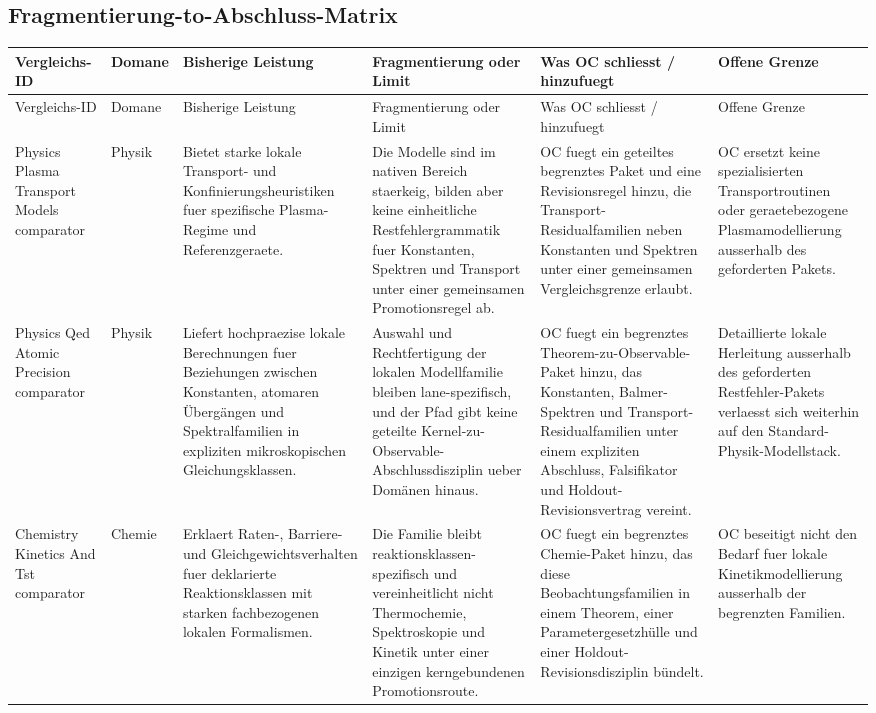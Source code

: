 \subsection{Fragmentierung-to-Abschluss-Matrix}
\begin{longtable}{@{}L{0.17\textwidth}L{0.09\textwidth}L{0.17\textwidth}L{0.17\textwidth}L{0.20\textwidth}L{0.14\textwidth}@{}}
\toprule
Vergleichs-ID & Domane & Bisherige Leistung & Fragmentierung oder Limit & Was OC schliesst / hinzufuegt & Offene Grenze \\
\midrule
\endfirsthead
\toprule
Vergleichs-ID & Domane & Bisherige Leistung & Fragmentierung oder Limit & Was OC schliesst / hinzufuegt & Offene Grenze \\
\midrule
\endhead
Physics Plasma Transport Models comparator & Physik & Bietet starke lokale Transport- und Konfinierungsheuristiken fuer spezifische Plasma-Regime und Referenzgeraete. & Die Modelle sind im nativen Bereich staerkeig, bilden aber keine einheitliche Restfehlergrammatik fuer Konstanten, Spektren und Transport unter einer gemeinsamen Promotionsregel ab. & OC fuegt ein geteiltes begrenztes Paket und eine Revisionsregel hinzu, die Transport-Residualfamilien neben Konstanten und Spektren unter einer gemeinsamen Vergleichsgrenze erlaubt. & OC ersetzt keine spezialisierten Transportroutinen oder geraetebezogene Plasmamodellierung ausserhalb des geforderten Pakets. \\
Physics Qed Atomic Precision comparator & Physik & Liefert hochpraezise lokale Berechnungen fuer Beziehungen zwischen Konstanten, atomaren Übergängen und Spektralfamilien in expliziten mikroskopischen Gleichungsklassen. & Auswahl und Rechtfertigung der lokalen Modellfamilie bleiben lane-spezifisch, und der Pfad gibt keine geteilte Kernel-zu-Observable-Abschlussdisziplin ueber Domänen hinaus. & OC fuegt ein begrenztes Theorem-zu-Observable-Paket hinzu, das Konstanten, Balmer-Spektren und Transport-Residualfamilien unter einem expliziten Abschluss, Falsifikator und Holdout-Revisionsvertrag vereint. & Detaillierte lokale Herleitung ausserhalb des geforderten Restfehler-Pakets verlaesst sich weiterhin auf den Standard-Physik-Modellstack. \\
Chemistry Kinetics And Tst comparator & Chemie & Erklaert Raten-, Barriere- und Gleichgewichtsverhalten fuer deklarierte Reaktionsklassen mit starken fachbezogenen lokalen Formalismen. & Die Familie bleibt reaktionsklassen-spezifisch und vereinheitlicht nicht Thermochemie, Spektroskopie und Kinetik unter einer einzigen kerngebundenen Promotionsroute. & OC fuegt ein begrenztes Chemie-Paket hinzu, das diese Beobachtungsfamilien in einem Theorem, einer Parametergesetzhülle und einer Holdout-Revisionsdisziplin bündelt. & OC beseitigt nicht den Bedarf fuer lokale Kinetikmodellierung ausserhalb der begrenzten Familien. \\

\end{longtable}

